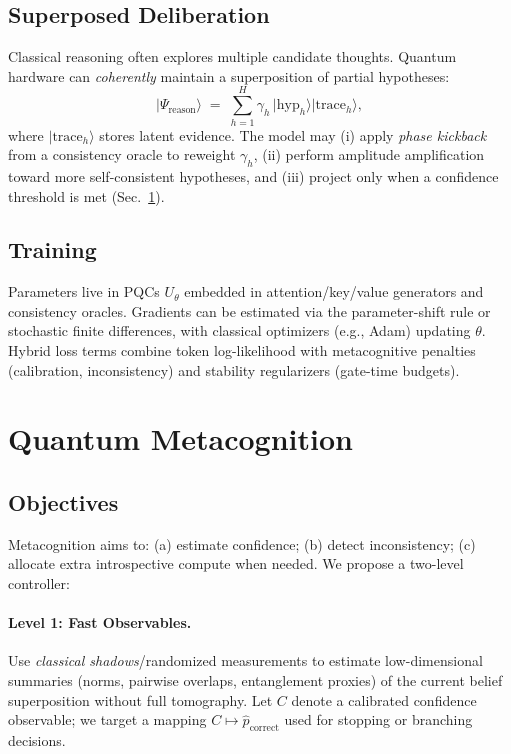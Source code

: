 \documentclass[11pt]{article}
\newcommand{\qket}[1]{\lvert #1 \rangle}
\begin{document}
\subsection{Superposed Deliberation}
Classical reasoning often explores multiple candidate thoughts.
Quantum hardware can \emph{coherently} maintain a superposition of partial hypotheses:
\begin{equation}
    \qket{\Psi_{\text{reason}}} 
    \;=\; \sum_{h=1}^{H} \gamma_h \,\qket{\text{hyp}_h}\qket{\text{trace}_h},
\end{equation}
where $\qket{\text{trace}_h}$ stores latent evidence.
The model may (i) apply \emph{phase kickback} from a consistency oracle to reweight $\gamma_h$, (ii) perform amplitude amplification toward more self-consistent hypotheses, and (iii) project only when a confidence threshold is met (Sec.~\ref{sec:meta}).

\subsection{Training}
Parameters live in PQCs $U_\theta$ embedded in attention/key/value generators and consistency oracles.
Gradients can be estimated via the parameter-shift rule or stochastic finite differences, with classical optimizers (e.g., Adam) updating $\theta$.
Hybrid loss terms combine token log-likelihood with metacognitive penalties (calibration, inconsistency) and stability regularizers (gate-time budgets).

\section{Quantum Metacognition}
\label{sec:meta}

\subsection{Objectives}
Metacognition aims to: (a) estimate confidence; (b) detect inconsistency; (c) allocate extra introspective compute when needed.
We propose a two-level controller:

\paragraph{Level 1: Fast Observables.}
Use \emph{classical shadows}/randomized measurements to estimate low-dimensional summaries (norms, pairwise overlaps, entanglement proxies) of the current belief superposition without full tomography.
Let $C$ denote a calibrated confidence observable; we target a mapping $C \mapsto \hat{p}_{\text{correct}}$ used for stopping or branching decisions.
\end{document}
